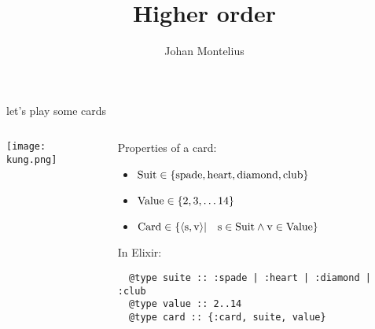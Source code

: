 

\title[ID1019 Higher order]{Higher order}


\author{Johan Montelius}
\date{\semester}



\begin{frame}
\titlepage
\end{frame}

\begin{frame}[fragile]{let's play some cards}

\begin{columns}

 \begin{column}{0.2\linewidth}
   \texttt{[image: kung.png]}
 \end{column}
 
 \pause

 \begin{column}{0.8\linewidth}
  Properties of a card:
  \begin{itemize}
   \item ${\rm Suit} \in \{{\rm spade}, {\rm heart}, {\rm diamond}, {\rm club}\}$
   \pause
   \item ${\rm Value} \in \{2,3,\ldots 14\}$
   \pause 
   \item ${\rm Card} \in  \{\langle {\rm s}, {\rm v} \rangle | \quad {\rm s} \in {\rm Suit} \wedge {\rm v} \in {\rm Value} \}$
  \end{itemize}

  \vspace{10pt}  \pause
  In Elixir:
  \begin{verbatim}
  @type suite :: :spade | :heart | :diamond | :club
  @type value :: 2..14
  @type card :: {:card, suite, value}
  \end{verbatim}

 \end{column}
\end{columns}

\end{frame}


